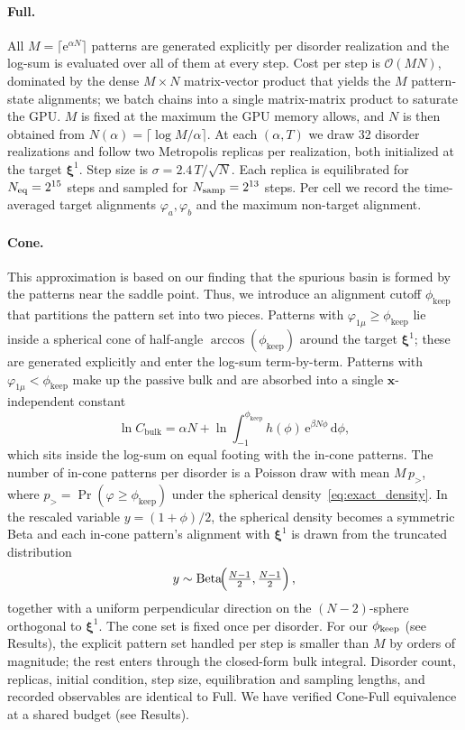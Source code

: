 \documentclass[letterpaper]{article} %
\newcommand{\bxi}{\boldsymbol{\xi}}
\newcommand{\bx}{\bm{x}}
\newcommand{\e}{{\mathrm{e}}}
\newcommand{\dd}{{\mathrm{d}}}
\newcommand{\Bnet}{\beta}
\begin{document}
\paragraph{Full.}
All $M = \lceil\e^{\alpha N}\rceil$ patterns are generated explicitly per
disorder realization and the log-sum is evaluated over all of them at
every step. Cost per step is $\mathcal{O}(MN)$, dominated by the dense 
$M \times N$ matrix-vector product that yields the $M$ pattern-state alignments;
we batch chains into a single matrix-matrix product to saturate the GPU. 
$M$ is fixed at the maximum the GPU memory allows, and $N$ is then
obtained from $N(\alpha) = \lceil \log M / \alpha \rceil$.  At each
$(\alpha, T)$ we draw 32 disorder realizations and follow two Metropolis
replicas per realization, both initialized at the target $\bxi^1$.  Step
size is $\sigma = 2.4\, T / \sqrt N$.  Each replica is equilibrated for
$N_{\rm eq} = 2^{15}$ steps and sampled for $N_{\rm samp} = 2^{13}$
steps.  Per cell we record the time-averaged target alignments
$\varphi_a, \varphi_b$ and the maximum non-target alignment.

\paragraph{Cone.}
This approximation is based on our finding that the spurious basin is formed
by the patterns near the saddle point. Thus, we introduce an alignment cutoff $\phi_{\mathrm{keep}}$ 
that partitions the pattern set into two pieces. Patterns with $\varphi_{1\mu} \geq \phi_{\mathrm{keep}}$
lie inside a spherical cone of half-angle $\arccos(\phi_{\mathrm{keep}})$
around the target $\bxi^1$; these are generated explicitly and enter the
log-sum term-by-term.  Patterns with $\varphi_{1\mu} < \phi_{\mathrm{keep}}$
make up the passive bulk and are absorbed into a single
$\bx$-independent constant
\begin{equation}
\ln C_{\mathrm{bulk}} = \alpha N + \ln \!\int_{-1}^{\phi_{\mathrm{keep}}}
 h(\phi)\,\e^{\Bnet N \phi}\,\dd\phi,
\label{eq:cbulk}
\end{equation}
which sits inside the log-sum on equal footing with the in-cone patterns.
The number of in-cone patterns per disorder is a Poisson draw with mean
$M\,p_{>}$, where $p_{>} = \Pr(\varphi \geq \phi_{\mathrm{keep}})$ under
the spherical density~\eqref{eq:exact_density}.  In the rescaled variable
$y = (1 + \phi)/2$, the spherical density becomes a symmetric Beta and
each in-cone pattern's alignment with $\bxi^1$ is drawn from the truncated
distribution
\begin{equation}
    y \sim \mathrm{Beta}\!\Bigl(\tfrac{N-1}{2}, \tfrac{N-1}{2}\Bigr)\,,
\label{eq:beta-tail}
\end{equation}
together with a uniform perpendicular direction on the $(N{-}2)$-sphere
orthogonal to $\bxi^1$.  The cone set is fixed once per disorder.
For our $\phi_{\rm keep}$ (see Results), the explicit pattern set
handled per step is smaller than $M$ by orders of magnitude; the rest
enters through the closed-form bulk integral.  Disorder count,
replicas, initial condition, step size, equilibration and sampling
lengths, and recorded observables are identical to Full.  We have
verified Cone-Full equivalence at a shared budget (see Results).
\end{document}
